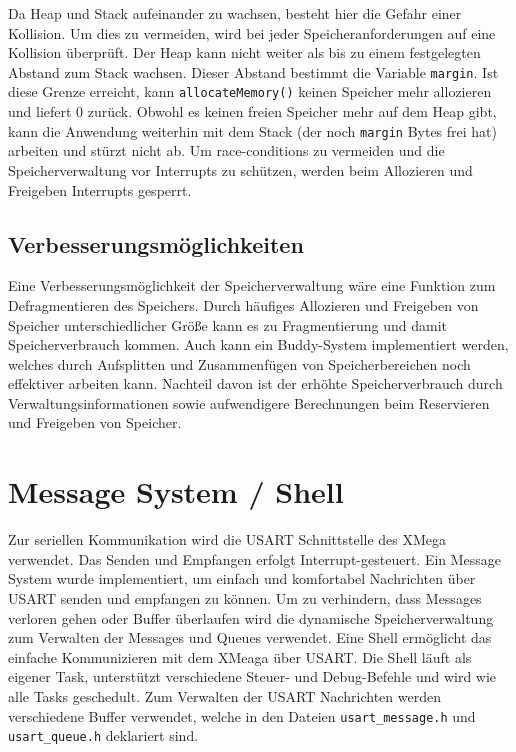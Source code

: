 \documentclass[fontsize=12pt, toc=bibliography, notitlepage]{scrreprt}
\begin{document}
Da Heap und Stack aufeinander zu wachsen, besteht hier die Gefahr einer Kollision. Um dies zu vermeiden, wird bei jeder Speicheranforderungen auf eine Kollision überprüft. Der Heap kann nicht weiter als bis zu einem festgelegten Abstand zum Stack wachsen. Dieser Abstand bestimmt die Variable \lstinline$margin$. Ist diese Grenze erreicht, kann \lstinline$allocateMemory()$ keinen Speicher mehr allozieren und liefert 0 zurück. Obwohl es keinen freien Speicher mehr auf dem Heap gibt, kann die Anwendung weiterhin mit dem Stack (der noch \lstinline$margin$ Bytes frei hat) arbeiten und stürzt nicht ab. Um race-conditions zu vermeiden und die Speicherverwaltung vor Interrupts zu schützen, werden beim Allozieren und Freigeben Interrupts gesperrt.

\section{Verbesserungsmöglichkeiten}
Eine Verbesserungsmöglichkeit der Speicherverwaltung wäre eine Funktion zum Defragmentieren des Speichers. Durch häufiges Allozieren und Freigeben von Speicher unterschiedlicher Größe kann es zu Fragmentierung und damit Speicherverbrauch kommen. Auch kann ein Buddy-System implementiert werden, welches durch Aufsplitten und Zusammenfügen von Speicherbereichen noch effektiver arbeiten kann. Nachteil davon ist der erhöhte Speicherverbrauch durch Verwaltungsinformationen sowie aufwendigere Berechnungen beim Reservieren und Freigeben von Speicher.

\chapter{Message System / Shell}
\label{chap:die-shell}
Zur seriellen Kommunikation wird die USART Schnittstelle des XMega verwendet. Das Senden und Empfangen erfolgt Interrupt-gesteuert. Ein Message System wurde implementiert, um einfach und komfortabel Nachrichten über USART senden und empfangen zu können. Um zu verhindern, dass Messages verloren gehen oder Buffer überlaufen wird die dynamische Speicherverwaltung zum Verwalten der Messages und Queues verwendet. Eine Shell ermöglicht das einfache Kommunizieren mit dem XMeaga über USART. Die Shell läuft als eigener Task, unterstützt verschiedene Steuer- und Debug-Befehle und wird wie alle Tasks geschedult. Zum Verwalten der USART Nachrichten werden verschiedene Buffer verwendet, welche in den Dateien \lstinline$usart_message.h$ und \lstinline$usart_queue.h$ deklariert sind.
\end{document}
